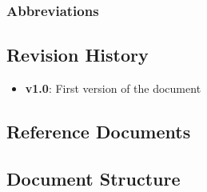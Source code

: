 \subsubsection{Abbreviations}


\subsection{Revision History}
\begin{itemize}
	\item
	\textbf{v1.0}: First version of the document
\end{itemize}


\subsection{Reference Documents}

\subsection{Document Structure}

